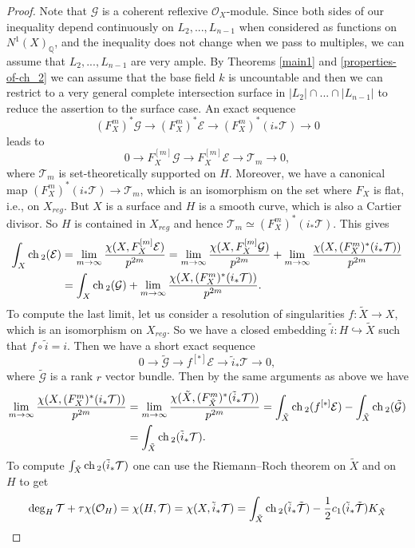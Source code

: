 \documentclass[12pt]{article}
\theoremstyle{plain}
\theoremstyle{definition}
\theoremstyle{remark}
\newcommand{\QQ}{{\mathbb Q}}
\newcommand{\cE}{{\mathcal E}}
\newcommand{\cG}{{\mathcal G}}
\newcommand{\cO}{{\mathcal O}}
\newcommand{\cT}{{\mathcal T}}
\newcommand{\ch}{{\mathop{\rm ch \, }}}
\begin{document}
\begin{proof}
	Note that $\cG$ is a coherent reflexive $\cO_X$-module.
	Since both sides of our inequality depend continuously on $L_2,...,L_{n-1}$ when considered as functions on $N^1(X)_{\QQ}$, and the inequality does not change when we pass to multiples,  we can assume that $L_2,..., L_{n-1}$ are very ample. By Theorems \ref{main1} and \ref{properties-of-ch_2} we can assume that the base field $k$ is uncountable and  then we can restrict to a very general complete intersection surface in $|L_2|\cap ...\cap |L_{n-1}|$ to reduce the assertion to the surface case. 
	An exact sequence
	$$(F_X^m)^*\cG\to 
	(F_X^m)^*	\cE \to (F_X^m)^* (i_*\cT)\to 0$$
	leads to 
	$$0\to F_X^{[m]}\cG\to 
	F_X^{[m]} \cE \to \cT_m\to 0, $$
	where $\cT_m $ is set-theoretically supported on $H$.
	Moreover, we have a canonical map $(F_X^m)^* (i_*\cT)\to \cT_m$, which is an isomorphism 
	on the set where $F_X$ is flat, i.e., on $X_{reg}$. 
	But $X$ is a surface and $H$ is a smooth curve, which is also a Cartier divisor. So $H$ is contained in $X_{reg}$ and hence $\cT_m\simeq (F_X^m)^* (i_*\cT)$. 
	This gives
	\begin{align*}
		\int _X \ch_2 (\cE)	&=\lim _{m\to \infty }\frac{\chi (X, F_X^{[m]} \cE)}{p^{2m}}=\lim _{m\to \infty }\frac{\chi (X,  F_X^{[m]} \cG)}{p^{2m}}+\lim _{m\to \infty }\frac{\chi (X, (F_X^m)^* (i_*\cT))}{p^{2m}}\\
		&=\int _X \ch_2 (\cG) +\lim _{m\to \infty }\frac{\chi (X, (F_X^m)^* (i_*\cT))}{p^{2m}}.
	\end{align*}
	To compute the last limit, let us consider a resolution of singularities $f: \tilde X\to X$, which is an isomorphism on $X_{reg}$. So we have a closed embedding $\tilde i: H\hookrightarrow \tilde X$ such that $f\circ \tilde i=i$.	 Then we have a short exact sequence
	$$0\to \tilde \cG\to  f^{[*]}\cE \to \tilde i_*\cT\to 0,$$
	where $\tilde \cG$ is a rank $r$ vector bundle. 
	Then by the same arguments as above we have
	\begin{align*}
		\lim _{m\to \infty }\frac{\chi (X, (F_X^m)^* (i_*\cT))}{p^{2m}}&=
		\lim _{m\to \infty }\frac{\chi (\tilde X, (F_{\tilde X}^m)^* (\tilde i_* \cT))}{p^{2m}}=
		\int _{\tilde X} \ch_2 (f^{[*]}\cE)- \int _{\tilde X} \ch_2 (\tilde \cG)\\
		& = \int _{\tilde X} \ch_2 (\tilde i_*\cT).
	\end{align*}
	To compute $\int _{\tilde X} \ch_2 (\tilde i_*\cT)$ one can use the Riemann--Roch theorem on $\tilde X$ and on $H$ to get
	$$ \deg _H \cT+\tau \chi (\cO_H)=\chi (H, \cT)=\chi (X,\tilde i_* \cT)= \int _{\tilde X} \ch_2 (\tilde i_*\tilde \cT)- \frac{1}{2}c_1(\tilde i_*\tilde \cT)K_{\tilde X}$$

\end{proof}
\end{document}
